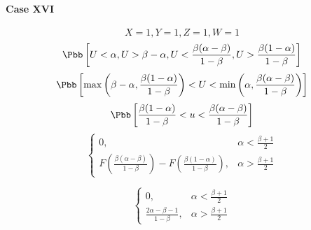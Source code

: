 \paragraph{Case XVI}
\[X = 1, Y = 1, Z = 1, W = 1\]
\[\Pbb\left[U < \alpha, U > \beta-\alpha, U < \frac{\beta(\alpha-\beta)}{1-\beta}, U > \frac{\beta(1-\alpha)}{1-\beta}\right]\]
\[\Pbb\left[\max\left(\beta-\alpha,\frac{\beta(1-\alpha)}{1-\beta}\right) < U < \min\left(\alpha,\frac{\beta(\alpha-\beta)}{1-\beta}\right)\right]\]
\[\Pbb\left[\frac{\beta(1-\alpha)}{1-\beta} < u < \frac{\beta(\alpha-\beta)}{1-\beta}\right]\]
\begin{displaymath}
\left\{\begin{array}{rl}
0, & \alpha < \frac{\beta + 1}{2}\\
F\left(\frac{\beta(\alpha-\beta)}{1-\beta}\right)-F\left(\frac{\beta(1-\alpha)}{1-\beta}\right), & \alpha > \frac{\beta + 1}{2}
\end{array}\right.
\end{displaymath}

\begin{displaymath}
\left\{\begin{array}{rl}
0, & \alpha < \frac{\beta + 1}{2}\\
\frac{2\alpha-\beta-1}{1-\beta}, & \alpha > \frac{\beta + 1}{2}
\end{array}\right.
\end{displaymath}